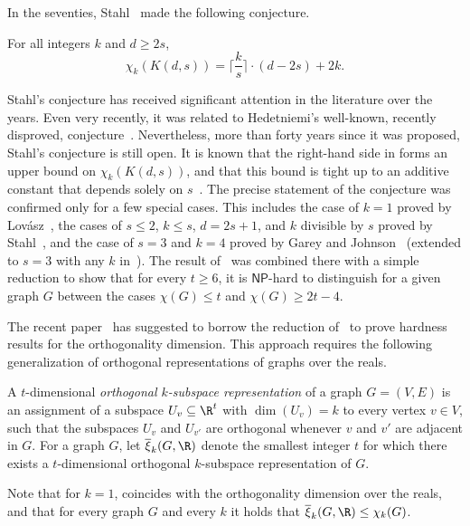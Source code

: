 \documentclass{toc}
\newcommand{\NP}{\mathsf{NP}}
\newcommand{\od}{\overline{\xi}}
\begin{document}
In the seventies, Stahl~\cite{Stahl76} made the following conjecture.
\begin{conjecture}\label{conj:Stahl}
For all integers $k$ and $d \geq 2s$,
\[\chi_k(K(d,s)) = \Big \lceil \frac{k}{s} \Big \rceil \cdot (d-2s)+2k.\]
\end{conjecture}
\noindent
Stahl's conjecture has received significant attention in the literature over
the years. Even very recently, it was related to
%
%
Hedetniemi's well-known, recently disproved, conjecture~\cite{TradifZ19}. %
Nevertheless, more than forty years since it was proposed, Stahl's conjecture
is still open.
It is known that the right-hand side in  forms an upper bound on $\chi_k(K(d,s))$, and that this bound is tight up to an additive constant that depends solely on $s$~\cite{CGJ78,Stahl98}.
The precise statement of the conjecture was confirmed only for a few special cases. This includes the case of $k=1$ proved by Lov\'asz~\cite{LovaszKneser}, the cases of $s \leq 2$, $k \leq s$, $d=2s+1$, and $k$ divisible by $s$ proved by Stahl~\cite{Stahl76,Stahl98}, and the case of $s=3$ and $k=4$ proved by Garey and Johnson~\cite{GareyJ76a} (extended to $s=3$ with any $k$ in~\cite{Stahl98}). The result of~\cite{GareyJ76a} was combined there with a simple reduction to show that for every $t \geq 6$, it is $\NP$-hard 
%
%
to distinguish for a given graph $G$ between the cases $\chi(G) \leq t$ and $\chi(G) \geq 2t-4$.

The recent %
paper~\cite{HavivMFCS19}  %
has suggested to borrow the reduction of~\cite{GareyJ76a} to prove hardness results for the orthogonality dimension.
%
%
This approach requires the following generalization of orthogonal representations of graphs over the reals.

\begin{definition}\label{def:ortho_k-subspace}
%
%
A $t$-dimensional \emph{orthogonal $k$-subspace representation} of a graph $G=(V,E)$ is an assignment of a subspace $U_v \subseteq \R^t$ with $\dim (U_v)=k$ to every vertex $v \in V$, such that the subspaces $U_v$ and $U_{v'}$ are orthogonal whenever $v$ and $v'$ are adjacent in $G$. For a graph $G$, let $\od_k(G,\R)$ denote the smallest integer $t$ for which there exists a $t$-dimensional orthogonal $k$-subspace representation of $G$.
\end{definition}
\noindent
Note that for $k=1$,  coincides with the orthogonality dimension over the reals, and that for every graph $G$ and every $k$ it holds that $\od_k(G,\R) \leq \chi_k(G)$.
\end{document}
